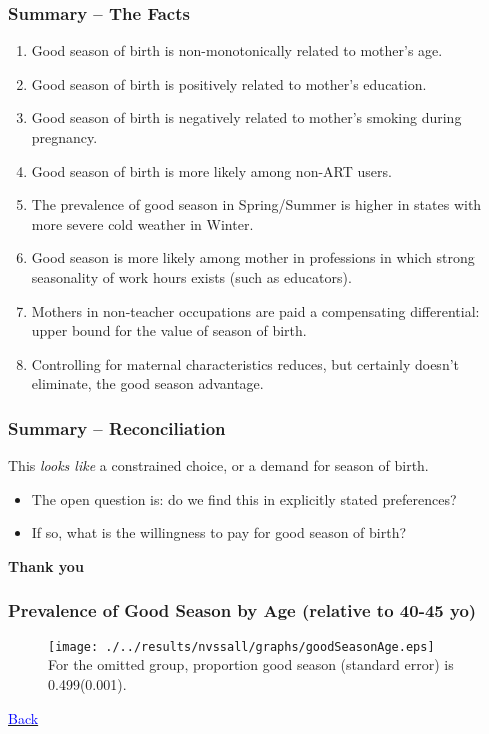 \documentclass[10pt,letterpaper,subeqn]{beamer}
\begin{document}
\begin{frame}[label=conclusions]
\frametitle{Summary -- The Facts}
\begin{enumerate}
\item Good season of birth is non-monotonically related to mother's age.
\item Good season of birth is positively related to mother's education.
\item Good season of birth is negatively related to mother's smoking during pregnancy.
\item Good season of birth is more likely among non-ART users.
\item The prevalence of good season in Spring/Summer is higher in states with more severe cold weather in Winter.
\item Good season is more likely among mother in professions in which strong seasonality of work hours exists (such as educators).
\item Mothers in non-teacher occupations are paid a compensating differential: upper bound for the value of season of birth.
\item Controlling for maternal characteristics reduces, but certainly doesn't eliminate, the good season advantage.
\end{enumerate}
\end{frame}

\begin{frame}[label=conclusions2]
\frametitle{Summary -- Reconciliation}
This \emph{looks like} a constrained choice, or a demand for season of birth.
\vspace{3mm} \\
\begin{itemize}
\item The open question is: do we find this in explicitly stated preferences?
\item If so, what is the willingness to pay for good season of birth?
\end{itemize}
\end{frame}


\begin{frame}
  \begin{center}
    \textbf{Thank you}
  \end{center}
\end{frame}

\begin{frame}[label=agesAll]
\frametitle{Prevalence of Good Season by Age (relative to 40-45 yo)}
\begin{figure}[htpb!]
  \centering
  \texttt{[image: ./../results/nvssall/graphs/goodSeasonAge.eps]} \\
{\footnotesize For the omitted group, proportion good season (standard error) is 0.499(0.001).}
\end{figure}
\hyperlink{ages}{\textcolor{blue}{Back}}
\end{frame}
\end{document}
